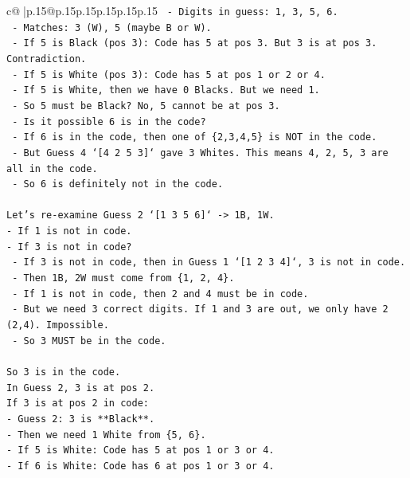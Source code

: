 \documentclass{article}
\begin{document}
{\begin{supertabular}{c@{$\;$}|p{.15\linewidth}@{}p{.15\linewidth}p{.15\linewidth}p{.15\linewidth}p{.15\linewidth}p{.15\linewidth}}
{{{\texttt{    {-}   Digits in guess: 1, 3, 5, 6.} \\
\texttt{    {-}   Matches: 3 (W), 5 (maybe B or W).} \\
\texttt{    {-}   If 5 is Black (pos 3): Code has 5 at pos 3. But 3 is at pos 3. Contradiction.} \\
\texttt{    {-}   If 5 is White (pos 3): Code has 5 at pos 1 or 2 or 4.} \\
\texttt{    {-}   If 5 is White, then we have 0 Blacks. But we need 1.} \\
\texttt{    {-}   So 5 must be Black? No, 5 cannot be at pos 3.} \\
\texttt{    {-}   Is it possible 6 is in the code?} \\
\texttt{        {-}   If 6 is in the code, then one of \{2,3,4,5\} is NOT in the code.} \\
\texttt{        {-}   But Guess 4 `{[}4 2 5 3{]}` gave 3 Whites. This means 4, 2, 5, 3 are all in the code.} \\
\texttt{        {-}   So 6 is definitely not in the code.} \\
\\ 
\texttt{Let's re{-}examine Guess 2 `{[}1 3 5 6{]}` {-}> 1B, 1W.} \\
\texttt{{-}   If 1 is not in code.} \\
\texttt{{-}   If 3 is not in code?} \\
\texttt{    {-}   If 3 is not in code, then in Guess 1 `{[}1 2 3 4{]}`, 3 is not in code.} \\
\texttt{    {-}   Then 1B, 2W must come from \{1, 2, 4\}.} \\
\texttt{    {-}   If 1 is not in code, then 2 and 4 must be in code.} \\
\texttt{    {-}   But we need 3 correct digits. If 1 and 3 are out, we only have 2 (2,4). Impossible.} \\
\texttt{    {-}   So 3 MUST be in the code.} \\
\\ 
\texttt{So 3 is in the code.} \\
\texttt{In Guess 2, 3 is at pos 2.} \\
\texttt{If 3 is at pos 2 in code:} \\
\texttt{{-}   Guess 2: 3 is **Black**.} \\
\texttt{{-}   Then we need 1 White from \{5, 6\}.} \\
\texttt{{-}   If 5 is White: Code has 5 at pos 1 or 3 or 4.} \\
\texttt{{-}   If 6 is White: Code has 6 at pos 1 or 3 or 4.} \\
}}}
\end{supertabular}}
\end{document}
